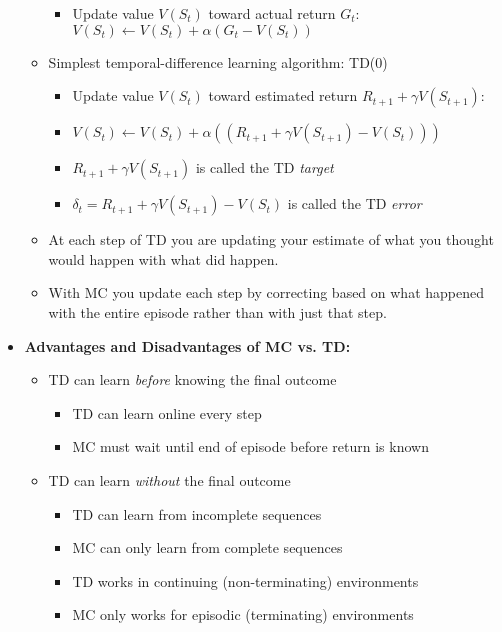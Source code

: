 \documentclass[12pt]{article}
\begin{document}
\begin{itemize}
\begin{itemize}
\begin{itemize}
        \item Update value $V(S_t)$ toward actual return $G_t$:
        $V(S_t) \leftarrow V(S_t) + \alpha(G_t - V(S_t))$
      \end{itemize}
      \item Simplest temporal-difference learning algorithm: TD(0)
      \begin{itemize}
        \item Update value $V(S_t)$ toward estimated return $R_{t+1} + \gamma V(S_{t+1})$:
        \item $V(S_t) \leftarrow V(S_t) + \alpha((R_{t+1} + \gamma V(S_{t+1}) - V(S_t)))$
        \item $R_{t+1} + \gamma V(S_{t+1})$ is called the TD \textit{target}
        \item $\delta_t = R_{t+1} + \gamma V(S_{t+1}) - V(S_t)$ is called the TD \textit{error}
      \end{itemize}
      \item At each step of TD you are updating your estimate of what you thought would happen
      with what did happen.
      \item With MC you update each step by correcting based on what happened with the entire episode
      rather than with just that step.
    \end{itemize}
    \item \textbf{Advantages and Disadvantages of MC vs. TD:}
    \begin{itemize}
      \item TD can learn \textit{before} knowing the final outcome
      \begin{itemize}
        \item TD can learn online every step
        \item MC must wait until end of episode before return is known
      \end{itemize}
      \item TD can learn \textit{without} the final outcome
      \begin{itemize}
        \item TD can learn from incomplete sequences
        \item MC can only learn from complete sequences
        \item TD works in continuing (non-terminating) environments
        \item MC only works for episodic (terminating) environments
      \end{itemize}
    \end{itemize}

\end{itemize}
\end{document}
